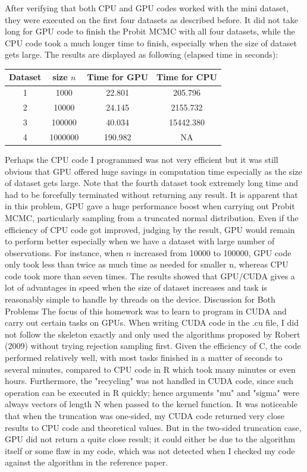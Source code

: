 \documentclass[12pt]{article}
\begin{document}
After verifying that both CPU and GPU codes worked with the mini dataset, they were executed on the first four datasets as described before. It did not take long for GPU code to finish the Probit MCMC with all four datasets, while the CPU code took a much longer time to finish, especially when the size of dataset gets large. The results are displayed as following (elapsed time in seconds):
\begin{center}
	\begin{tabular}{|c|c|c|c|}
	\hline
	Dataset & size $n$ & Time for GPU & Time for CPU \\
	\hline
	1 & 1000 & 22.801 & 205.796 \\
	2 & 10000 & 24.145 & 2155.732 \\
	3 & 100000 & 40.034 & 15442.380 \\
	4 & 1000000 & 190.982 & NA \\
	\hline
	\end{tabular}
\end{center}
Perhaps the CPU code I programmed was not very efficient but it was still obvious that GPU offered huge savings in computation time especially as the size of dataset gets large. Note that the fourth dataset took extremely long time and had to be forcefully terminated without returning any result.\newline
It is apparent that in this problem, GPU gave a huge performance boost when carrying out Probit MCMC, particularly sampling from a truncated normal distribution. Even if the efficiency of CPU code got improved, judging by the result, GPU would remain to perform better especially when we have a dataset with large number of observations. For instance, when $n$ increased from 10000 to 100000, GPU code only took less than twice as much time as needed for smaller n, whereas CPU code took more than seven times. The results showed that GPU/CUDA gives a lot of advantages in speed when the size of dataset increases and task is reasonably simple to handle by threads on the device. \newline \newline
Discussion for Both Problems \newline \newline
The focus of this homework was to learn to program in CUDA and carry out certain tasks on GPUs. When writing CUDA code in the .cu file, I did not follow the skeleton exactly and only used the algorithms proposed by Robert (2009) without trying rejection sampling first. Given the efficiency of C, the code performed relatively well, with most tasks finished in a matter of seconds to several minutes, compared to CPU code in R which took many minutes or even hours. Furthermore, the "recycling" was not handled in CUDA code, since such operation can be executed in R quickly; hence arguments "mu" and "sigma" were always vectors of length N when passed to the kernel function. It was noticeable that when the truncation was one-sided, my CUDA code returned very close results to CPU code and theoretical values. But in the two-sided truncation case, GPU did not return a quite close result; it could either be due to the algorithm itself or some flaw in my code, which was not detected when I checked my code against the algorithm in the reference paper.
\end{document}
